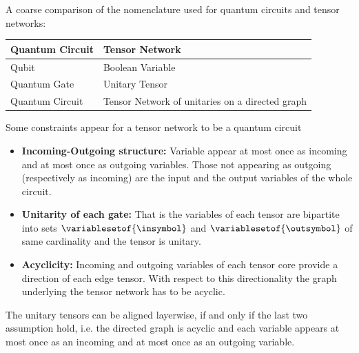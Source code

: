 A coarse comparison of the nomenclature used for quantum circuits and tensor networks:

\begin{center}
    \begin{tabular}{l|l}
        \textbf{Quantum Circuit} & \textbf{Tensor Network}                         \\
        \hline
        Qubit                    & Boolean Variable                                \\
        Quantum Gate             & Unitary Tensor                                  \\
        Quantum Circuit          & Tensor Network of unitaries on a directed graph
    \end{tabular}
\end{center}

Some constraints appear for a tensor network to be a quantum circuit
\begin{itemize}
    \item \textbf{Incoming-Outgoing structure:} Variable appear at most once as incoming and at most once as outgoing variables.
    Those not appearing as outgoing (respectively as incoming) are the input and the output variables of the whole circuit.
    \item \textbf{Unitarity of each gate:} That is the variables of each tensor are bipartite into sets $\variablesetof{\insymbol}$ and $\variablesetof{\outsymbol}$ of same cardinality and the tensor is unitary.
    \item \textbf{Acyclicity:} Incoming and outgoing variables of each tensor core provide a direction of each edge tensor.
    With respect to this directionality the graph underlying the tensor network has to be acyclic.
\end{itemize}

The unitary tensors can be aligned layerwise, if and only if the last two assumption hold, i.e. the directed graph is acyclic and each variable appears at most once as an incoming and at most once as an outgoing variable.
